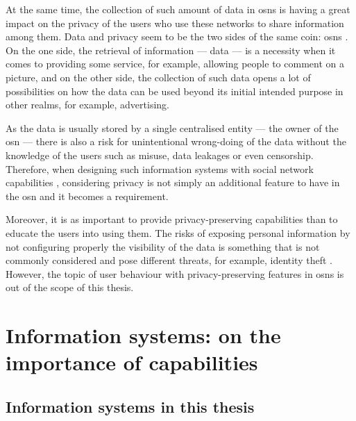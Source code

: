 \documentclass[showtrims]{kthesis}
\begin{document}
At the same time, the collection of such amount of data in \acp{osn} is having a great 
impact on the privacy of the users who use these networks to share information among 
them. Data and privacy seem to be the two sides of the same coin: \acp{osn} \cite{BelkinC92}. 
On the one side, the retrieval of information --- data --- is 
a necessity when it comes to providing some service, for example, allowing people 
to comment on a picture, and on the other side, the collection of such data opens 
a lot of possibilities on how the data can be used beyond its initial intended purpose 
in other realms, for example, advertising.

As the data is usually stored by a single centralised entity --- the owner of the 
\ac{osn} --- there is also a risk for unintentional wrong-doing of the data without 
the knowledge of the users such as misuse, data leakages or even censorship. Therefore, 
when designing such information systems with social network capabilities \cite{Abrams06, Lunt06, Lunt07, Zhu08, Lunt09}, 
considering privacy is not simply an additional feature to have in the \ac{osn} 
and it becomes a requirement. 

Moreover, it is as important to provide privacy-preserving capabilities than to 
educate the users into using them. The risks of exposing personal information by 
not configuring properly the visibility of the data is something that is not commonly 
considered and pose different threats, for example, identity theft \cite{GrossAH05, BrandtzaegLS10}. 
However, the topic of user behaviour with privacy-preserving features in \acp{osn} 
is out of the scope of this thesis.

\section{Information systems: on the importance of capabilities}

\subsection{Information systems in this thesis}
\end{document}
